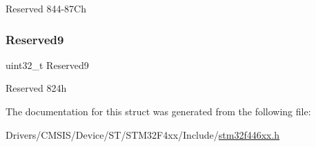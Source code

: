 Reserved 844-\/87\+Ch \mbox{\label{struct_u_s_b___o_t_g___device_type_def_a5dc05e38e6d591cd88f820b7a0b3f727}} 
\subsubsection{\texorpdfstring{Reserved9}{Reserved9}}
{\footnotesize\ttfamily uint32\+\_\+t Reserved9}

Reserved 824h 

The documentation for this struct was generated from the following file\+:\begin{DoxyCompactItemize}
\item 
Drivers/\+C\+M\+S\+I\+S/\+Device/\+S\+T/\+S\+T\+M32\+F4xx/\+Include/\mbox{\hyperlink{stm32f446xx_8h}{stm32f446xx.\+h}}\end{DoxyCompactItemize}

